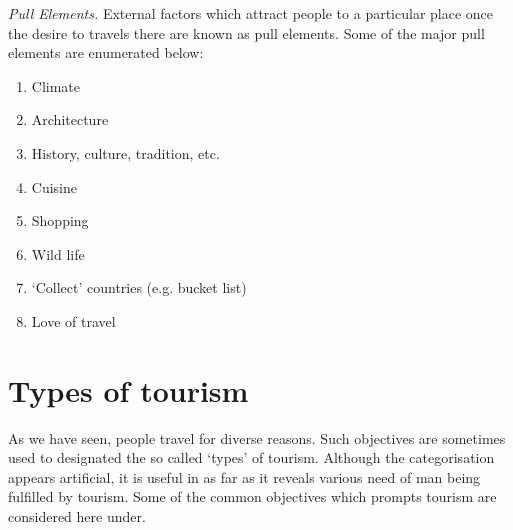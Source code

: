 \noindent\emph{Pull Elements.} External factors which attract people to a particular place once the desire to travels there are known as pull elements. Some of the major pull elements are enumerated below:

\begin{enumerate}[noitemsep]
  \item Climate
  \item Architecture
  \item History, culture, tradition, etc.
  \item Cuisine
  \item Shopping
  \item Wild life
  \item `Collect' countries (e.g. bucket list)
  \item Love of travel
\end{enumerate}

\section{Types of tourism} %
\label{sec:types}

As we have seen, people travel for diverse reasons. Such objectives are sometimes used to designated the so called `types' of tourism. Although the categorisation appears artificial, it is useful in as far as it reveals various need of man being fulfilled by tourism. Some of the common objectives which prompts tourism are considered here under.

